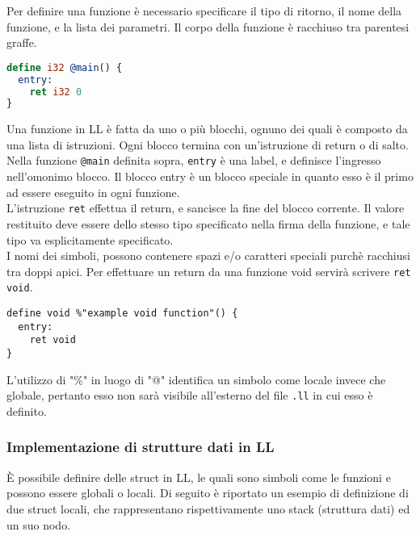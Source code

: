 Per definire una funzione è necessario specificare il tipo di ritorno, il 
nome della funzione, e la lista dei parametri. Il corpo della funzione 
è racchiuso tra parentesi graffe. \\ 

\begin{lstlisting}[frame=single, language=LLVM]
define i32 @main() {
  entry:
    ret i32 0
}
\end{lstlisting}
\vspace{0.5cm}

Una funzione in LL è fatta da uno o più blocchi, ognuno dei quali è composto da 
una lista di istruzioni. Ogni blocco termina con un'istruzione di return o di salto. 
Nella funzione \texttt{@main} definita sopra, \texttt{entry} è una label, e definisce 
l'ingresso nell'omonimo blocco. Il blocco entry è un blocco speciale in quanto esso è 
il primo ad essere eseguito in ogni funzione. \\

L'istruzione \texttt{ret} effettua il return, e sancisce la fine del blocco 
corrente. Il valore restituito deve essere dello stesso tipo specificato nella 
firma della funzione, e tale tipo va esplicitamente specificato. \\

I nomi dei simboli, possono contenere spazi e/o caratteri speciali purchè
racchiusi tra doppi apici. Per effettuare un return da una funzione void 
servirà scrivere \texttt{ret void}. \\

\begin{lstlisting}[frame=single]
define void %"example void function"() {
  entry:
    ret void
}
\end{lstlisting}
\vspace{0.5cm}

L'utilizzo di "\%" in luogo di "@" identifica un simbolo come locale invece che globale, pertanto 
esso non sarà visibile all'esterno del file \texttt{.ll} in cui esso è definito.

\newpage

\subsubsection{Implementazione di strutture dati in LL}
È possibile definire delle struct in LL, le quali sono simboli come le funzioni e possono essere 
globali o locali. Di seguito è riportato un esempio di definizione di due struct locali, che rappresentano 
rispettivamente uno stack (struttura dati) ed un suo nodo. \\

